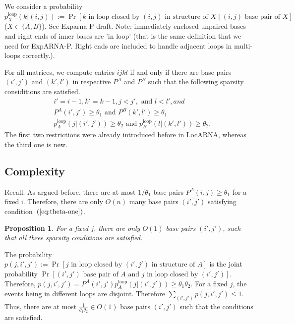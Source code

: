 \documentclass{article}
\newcommand{\pInLoop}[3]{p_{#1}^\textrm{loop}(#2|#3)}
\newcommand{\pInLoopA}[2]{\pInLoop{A}{#1}{#2}}
\newcommand{\pInLoopB}[2]{\pInLoop{B}{#1}{#2}}
\newcommand{\thetaOne}{\theta_1}
\newcommand{\thetaTwo}{\theta_2}
\newtheorem{proposition}[theorem]{Proposition}
\newenvironment{proof}[1][Proof]{\begin{trivlist}
\item[\hskip \labelsep {\bfseries #1}]}{\end{trivlist}}
\begin{document}
We consider a probability $\pInLoop{X}{k}{(i,j)} := \Pr[\text{$k$ in
  loop closed by $(i,j)$ in structure of $X$} \mid \text{$(i,j)$ base
  pair of $X$}]$ ($X\in\{A,B\}$).  See Exparna-P draft. Note:
immediately enclosed unpaired bases and right ends of inner bases are
'in loop' (that is the same definition that we need for
ExpARNA-P. Right ends are included to handle adjacent loops in
multi-loops correctly.).

For all matrices, we compute entries $ijkl$ if and only if there are
base pairs $(i',j')$ and $(k',l')$ in respective $P^A$ and $P^B$ such
that the following sparsity considitions are satisfied.
\begin{align}
  & i'=i-1, k'=k-1, j<j',\text{ and }l<l', and \label{eq:startpoints}\\
  & P^A(i',j')\geq \thetaOne\text{ and }P^B(k',l')\geq \thetaOne  \label{eq:theta-one} \\
  & \pInLoopA{j}{(i',j')} \geq \thetaTwo\text{ and  }\pInLoopB{l}{(k',l')} \geq \thetaTwo\label{eq:theta-two}.
\end{align}
The first two restrictions were already introduced before in LocARNA, whereas
the third one is new. 

\subsection{Complexity}

Recall: As argued before, there are at most $1/\thetaOne$ base pairs
$P^A(i,j)\geq \thetaOne$ for a fixed i. Therefore, there are only
$O(n)$ many base pairs $(i',j')$ satisfying condition~$(\ref{eq:theta-one})$.

\begin{proposition}
  \label{prop:sparsity}
  For a fixed $j$, there are only $O(1)$ base pairs $(i',j')$, such
  that all three sparsity conditions are satisfied.
\end{proposition}

\begin{proof}
  The probability $p(j,i',j'):=\Pr[\text{$j$ in loop closed by
    $(i',j')$ in structure of $A$}]$ is the joint probability
  $\Pr[\text{$(i',j')$ base pair of $A$ and $j$ in loop closed by
    $(i',j')$}]$. Therefore,
  $p(j,i',j')=P^A(i',j')\pInLoopA{j}{(i',j')} \geq
  \thetaOne\thetaTwo$.  For a fixed $j$, the events being in different
  loops are disjoint. Therefore $\sum_{(i',j')} p(j,i',j') \leq
  1$. Thus, there are at most $\frac{1}{\thetaOne\thetaTwo} \in O(1)$
  base pairs $(i',j')$ such that the conditions are satisfied.
\end{proof}
\end{document}
